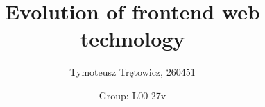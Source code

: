 \documentclass[12pt,a4paper]{article}
\title{\textbf{Evolution of frontend web technology}}
\author{Tymoteusz Trętowicz, 260451}
\date{Group: L00-27v}
\begin{document}
    \maketitle
    \pagebreak
\end{document}
